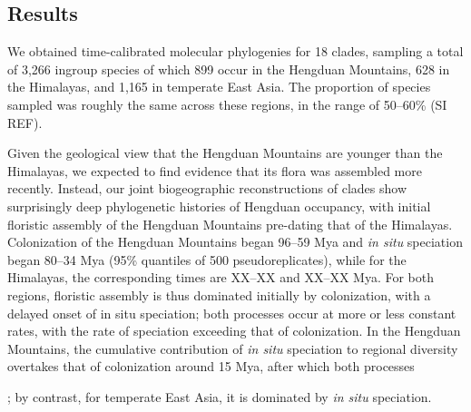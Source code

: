 \subsection{Results}

We obtained time-calibrated molecular phylogenies for 18 clades, sampling a total of 3,266 ingroup species of which 899 occur in the Hengduan Mountains, 628 in the Himalayas, and 1,165 in temperate East Asia. The proportion of species sampled was roughly the same across these regions, in the range of 50--60\% (SI REF).

Given the geological view that the Hengduan Mountains are younger than the Himalayas, we expected to find evidence that its flora was assembled more recently. Instead, our joint biogeographic reconstructions of clades show surprisingly deep phylogenetic histories of Hengduan occupancy, with initial floristic assembly of the Hengduan Mountains pre-dating that of the Himalayas. Colonization of the Hengduan Mountains began 96--59 Mya and \textit{in situ} speciation began 80--34 Mya (95\% quantiles of 500 pseudoreplicates), while for the Himalayas, the corresponding times are XX--XX and XX--XX Mya. For both regions, floristic assembly is thus dominated initially by colonization, with a delayed onset of in situ speciation; both processes occur at more or less constant rates, with the rate of speciation exceeding that of colonization. In the Hengduan Mountains, the cumulative contribution of \textit{in situ} speciation to regional diversity overtakes that of colonization around 15 Mya, after which both processes 

; by contrast, for temperate East Asia, it is dominated by \textit{in situ} speciation. 